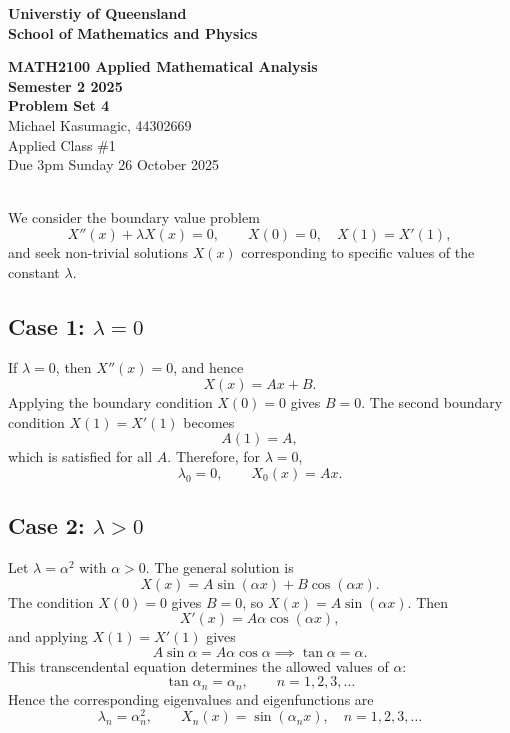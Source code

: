 \documentclass[a4paper,11pt]{report}
\begin{document}
\begin{center}
  {\bf\small Universtiy of Queensland \\ School of Mathematics and Physics}
\end{center}
\begin{center}
	{\Large\bf MATH2100 Applied Mathematical Analysis \\ Semester 2 2025 \\ Problem Set 4} \\ \vspace{1em}
	Michael Kasumagic, 44302669 \\
  Applied Class \#1 \\
	Due 3pm Sunday 26 October 2025
\end{center}

\sol \\
We consider the boundary value problem
\[
  X''(x) + \lambda X(x) = 0, \qquad X(0) = 0, \quad X(1) = X'(1),
\]
and seek non-trivial solutions \( X(x) \) corresponding to specific values of the constant \( \lambda \).

\subsection*{Case 1: \(\lambda = 0\)}
If \( \lambda = 0 \), then \( X''(x) = 0 \), and hence
\[
  X(x) = A x + B.
\]
Applying the boundary condition \( X(0) = 0 \) gives \( B = 0 \).  
The second boundary condition \( X(1) = X'(1) \) becomes
\[
  A(1) = A,
\]
which is satisfied for all \( A \). Therefore, for \(\lambda = 0\),
\[
  \lambda_0 = 0, \qquad X_0(x) = A x.
\]

\subsection*{Case 2: \(\lambda > 0\)}
Let \( \lambda = \alpha^2 \) with \( \alpha > 0 \). The general solution is
\[
  X(x) = A \sin(\alpha x) + B \cos(\alpha x).
\]
The condition \( X(0) = 0 \) gives \( B = 0 \), so \( X(x) = A \sin(\alpha x) \).  
Then
\[
  X'(x) = A \alpha \cos(\alpha x),
\]
and applying \( X(1) = X'(1) \) gives
\[
  A \sin \alpha = A \alpha \cos \alpha \implies \tan \alpha = \alpha.
\]
This transcendental equation determines the allowed values of \( \alpha \):
\[
  \tan \alpha_n = \alpha_n, \qquad n = 1, 2, 3, \ldots
\]
Hence the corresponding eigenvalues and eigenfunctions are
\[
  \lambda_n = \alpha_n^2, \qquad X_n(x) = \sin(\alpha_n x), \quad n = 1, 2, 3, \ldots
\]
\end{document}
